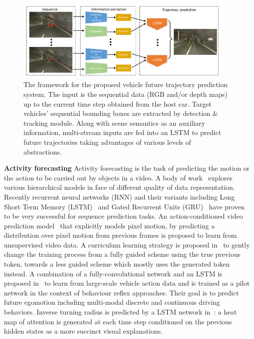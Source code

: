\documentclass[10pt,twocolumn,letterpaper]{article}
\begin{document}
\begin{figure}[t]
        \centering
        \includegraphics[width=0.95\textwidth]{figures/framework.pdf}
        \caption{
        \small{The framework for the proposed vehicle future trajectory prediction system. The input is the sequential data (RGB and/or depth maps) up to the current time step obtained from the host car. Target vehicles' sequential bounding boxes are extracted by detection \& tracking module. Along with scene semantics as an auxiliary information, multi-stream inputs are fed into an LSTM to predict future trajectories taking advantages of various levels of abstractions.}
        }
        \label{fig:framework}
\end{figure}

\noindent \textbf{Activity forecasting} Activity forecasting is the task of predicting the motion or the action to be carried out by objects in a video. 
A body of work~\cite{chalasani2013deep, clark2013whatever, egner2010expectation} explores various hierarchical models in face of different quality of data representation. 
 Recently recurrent neural networks (RNN) and their variants including Long Short Term Memory (LSTM)~\cite{hochreiter1997long} and Gated Recurrent Units (GRU)~\cite{chung2014empirical} have proven to be very successful for sequence prediction tasks.
 An action-conditioned video prediction model~\cite{finn2016unsupervised} that explicitly models pixel motion, by predicting a distribution over pixel motion from previous frames is proposed to learn from unsupervised video data.
 A curriculum learning strategy is proposed in~\cite{bengio2015scheduled} to gently change the training process from a fully guided scheme using the true previous token, towards a less guided scheme which mostly uses the generated token instead. 
A combination of a fully-convolutional network and an LSTM is proposed in~\cite{xu2017end} to learn from large-scale vehicle action data and  is trained as a pilot network in the context of behaviour reflex approaches. Their goal is to predict future egomotion including multi-modal discrete and continuous driving behaviors.
Inverse turning radius is predicted by a LSTM network in~\cite{kim2017interpretable}: a heat map of attention is generated at each time step conditioned on the previous hidden states as a more succinct visual explanations.
\end{document}

